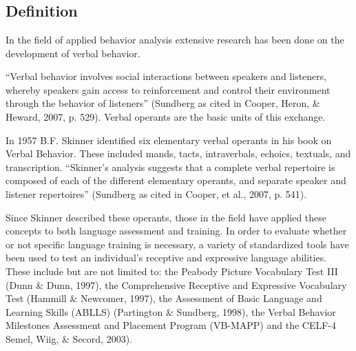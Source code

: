 \clearpage \section[\fourdNine{}]{\fourdNine{}%
              }
\subsection{Definition}
In the field of applied behavior analysis extensive research has been done on the development of verbal behavior.  

``Verbal behavior involves social interactions between speakers and listeners, whereby speakers gain access to reinforcement and control their environment through the behavior of listeners'' (Sundberg as cited in Cooper, Heron, \& Heward, 2007, p. 529). Verbal operants are the basic units of this exchange.  

In 1957 B.F. Skinner identified six elementary verbal operants in his book on Verbal Behavior.  These included mands, tacts, intraverbals, echoics, textuals, and transcription.  ``Skinner's analysis suggests that a complete verbal repertoire is composed of each of the different elementary operants, and separate speaker and listener repertoires'' (Sundberg as cited in Cooper, et al., 2007, p. 541).   

Since Skinner described these operants, those in the field have applied these concepts to both language assessment and training.  In order to evaluate whether or not specific language training is necessary, a variety of standardized tools have been used to test an individual's receptive and expressive language abilities.  These include but are not limited to: the Peabody Picture Vocabulary Test III (Dunn \& Dunn, 1997), the Comprehensive Receptive and Expressive Vocabulary Test (Hammill \& Newcomer, 1997), the Assessment of Basic Language and Learning Skills (ABLLS) (Partington \& Sundberg, 1998), the Verbal Behavior Milestones Assessment and Placement Program (VB-MAPP) and the CELF-4 Semel, Wiig, \& Secord, 2003).  

